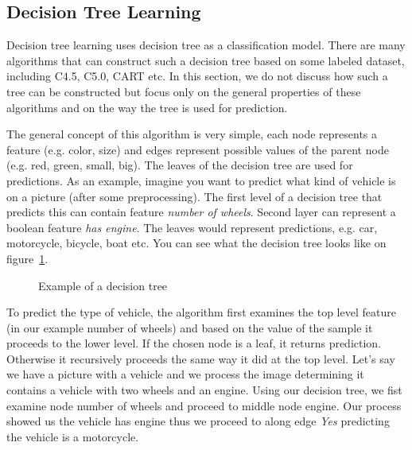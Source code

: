 \subsection{Decision Tree Learning}

Decision tree learning uses decision tree as a classification model. There are many algorithms that can construct such a decision tree based on some labeled dataset, including C4.5, C5.0, CART etc. In this section, we do not discuss how such a tree can be constructed but focus only on the general properties of these algorithms and on the way the tree is used for prediction.

The general concept of this algorithm is very simple, each node represents a feature (e.g. color, size) and edges represent possible values of the parent node (e.g. red, green, small, big). The leaves of the decision tree are used for predictions. As an example, imagine you want to predict what kind of vehicle is on a picture (after some preprocessing). The first level of a decision tree that predicts this can contain feature \textit{number of wheels}. Second layer can represent a boolean feature \textit{has engine}. The leaves would represent predictions, e.g. car, motorcycle, bicycle, boat etc. You can see what the decision tree looks like on figure~\ref{fig:decision.tree.example}.

\begin{figure}[htbp]
    \centering
    \caption{Example of a decision tree}
    \label{fig:decision.tree.example}
\end{figure}

To predict the type of vehicle, the algorithm first examines the top level feature (in our example number of wheels) and based on the value of the sample it proceeds to the lower level. If the chosen node is a leaf, it returns prediction. Otherwise it recursively proceeds the same way it did at the top level. Let's say we have a picture with a vehicle and we process the image determining it contains a vehicle with two wheels and an engine. Using our decision tree, we fist examine node number of wheels and proceed to middle node engine. Our process showed us the vehicle has engine thus we proceed to along edge \textit{Yes} predicting the vehicle is a motorcycle.

